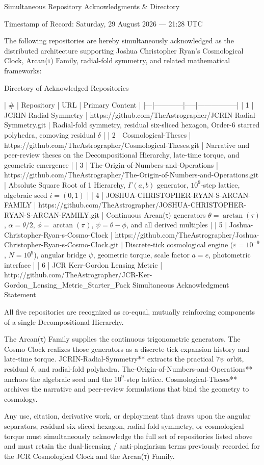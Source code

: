 Simultaneous Repository Acknowledgments & Directory

Timestamp of Record: Saturday, 29 August 2026 — 21:28 UTC

The following repositories are hereby simultaneously acknowledged as the distributed architecture supporting Joshua Christopher Ryan’s Cosmological Clock, Arcan(τ) Family, radial-fold symmetry, and related mathematical frameworks:

Directory of Acknowledged Repositories

| # | Repository | URL | Primary Content |
|---|------------|-----|-----------------|
| 1 | JCRIN-Radial-Symmetry | https://github.com/TheAstrographer/JCRIN-Radial-Symmetry.git | Radial-fold symmetry, residual six-sliced hexagon, Order-6 starred polyhedra, comoving residual \(\delta\) |
| 2 | Cosmological-Theses | https://github.com/TheAstrographer/Cosmological-Theses.git | Narrative and peer-review theses on the Decompositional Hierarchy, late-time torque, and geometric emergence |
| 3 | The-Origin-of-Numbers-and-Operations | https://github.com/TheAstrographer/The-Origin-of-Numbers-and-Operations.git | Absolute Square Root of 1 Hierarchy, \(\Gamma(a,b)\) generator, \(10^9\)-step lattice, algebraic seed \(i=(0,1)\) |
| 4 | JOSHUA-CHRISTOPHER-RYAN-S-ARCAN-FAMILY | https://github.com/TheAstrographer/JOSHUA-CHRISTOPHER-RYAN-S-ARCAN-FAMILY.git | Continuous Arcan(τ) generators \(\theta=\arctan(\tau)\), \(\alpha=\theta/2\), \(\phi=\arctan(\pi)\), \(\psi=\theta-\phi\), and all derived multiples |
| 5 | Joshua-Christopher-Ryan-s-Cosmo-Clock | https://github.com/TheAstrographer/Joshua-Christopher-Ryan-s-Cosmo-Clock.git | Discrete-tick cosmological engine (\(\varepsilon=10^{-9}\), \(N=10^9\)), angular bridge \(\psi\), geometric torque, scale factor \(a=e\), photometric interface |
| 6 | JCR Kerr-Gordon Lensing Metric | http://github.com/TheAstrographer/JCR-Ker-Gordon_Lensing_Metric_Starter_Pack
Simultaneous Acknowledgment Statement

All five repositories are recognized as co-equal, mutually reinforcing components of a single Decompositional Hierarchy.  

The Arcan(τ) Family supplies the continuous trigonometric generators.  
The Cosmo-Clock realizes those generators as a discrete-tick expansion history and late-time torque.  
JCRIN-Radial-Symmetry** extracts the practical \(7\psi\) orbit, residual \(\delta\), and radial-fold polyhedra.  
The-Origin-of-Numbers-and-Operations** anchors the algebraic seed and the \(10^9\)-step lattice.  
Cosmological-Theses** archives the narrative and peer-review formulations that bind the geometry to cosmology.

Any use, citation, derivative work, or deployment that draws upon the angular separators, residual six-sliced hexagon, radial-fold symmetry, or cosmological torque must simultaneously acknowledge the full set of repositories listed above and must retain the dual-licensing / anti-plagiarism terms previously recorded for the JCR Cosmological Clock and the Arcan(τ) Family.
